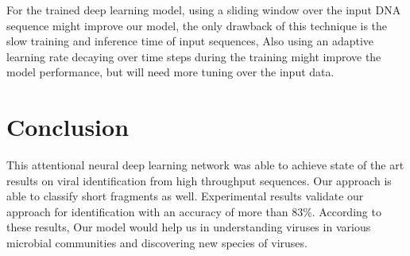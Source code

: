\documentclass[10pt,journal,compsoc]{IEEEtran}
\begin{document}
For the trained deep learning model, using a sliding window over the input DNA sequence might improve our model, the only drawback of this technique is the slow training and inference time of input sequences, Also using an adaptive learning rate decaying over time steps during the training might improve the model performance, but will need more tuning over the input data.

\section{Conclusion}

This attentional neural deep learning network was able to achieve state of the art results on viral identification from high throughput sequences. Our approach is able to classify short fragments as well. Experimental results validate our approach for identification with an accuracy of more than 83\%. According to these results, Our model would help us in understanding viruses in various microbial communities and discovering new species of viruses.



%
%

\end{document}
